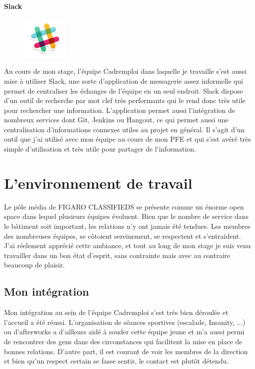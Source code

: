 \paragraph{Slack}
\label{par:Slack}
\begin{figure}
  \begin{center}
    \includegraphics[width=0.20\textwidth]{Pictures/slack_logo.png}
  \end{center}
\end{figure}
Au cours de mon stage, l'équipe Cadremploi dans laquelle je travaille s'est aussi mise à utiliser Slack, une sorte d'application de messagerie assez informelle qui permet de centraliser les échanges de l'équipe en un seul endroit.
Slack dispose d'un outil de recherche par mot clef très performants qui le rend donc très utile pour rechercher une information.
L'application permet aussi l'intégration de nombreux services dont Git, Jenkins ou Hangout, ce qui permet aussi une centralisation d'informations connexes utiles au projet en général.
Il s'agit d'un outil que j'ai utilisé avec mon équipe au cours de mon PFE et qui s'est avéré très simple d'utilisation et très utile pour partager de l'information.


\section{L'environnement de travail}
Le pôle média de FIGARO CLASSIFIEDS se présente comme un énorme open space dans lequel plusieurs équipes évoluent.
Bien que le nombre de service dans le bâtiment soit important, les relations n'y ont jamais été tendues.
Les membres des nombreuses équipes, se côtoient sereinement, se respectent et s'entraident.
J'ai réelement apprécié cette ambiance, et tout au long de mon stage je suis venu travailler dans un bon état d'esprit, sans contrainte mais avec au contraire beaucoup de plaisir.

\subsection{Mon intégration}
\label{sub:Mon intégration}
Mon intégration au sein de l'équipe Cadremploi s'est très bien déroulée et l'accueil a été réussi.
L'organisation de séances sportives (escalade, Insanity, ...) ou d'afterworks a d'ailleurs aidé à souder cette équipe jeune et m'a aussi permi de rencontrer des gens dans des circonstances qui facilitent la mise en place de bonnes relations.
D'autre part, il est courant de voir les membres de la direction et bien qu'un respect certain se fasse sentir, le contact est plutôt détendu.

